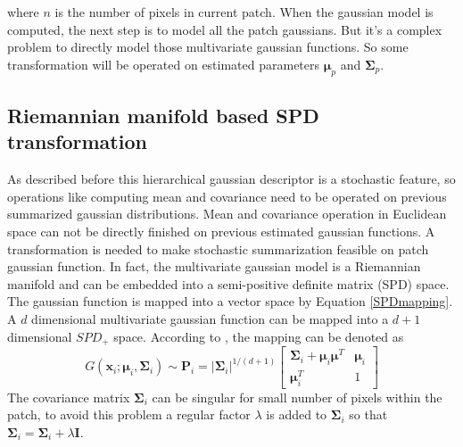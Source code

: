 where $n$ is the number of pixels in current patch. When the gaussian model is computed, the next step is to model all the patch gaussians. But it's a complex problem to directly model those multivariate gaussian functions. So some transformation will be operated on estimated parameters $\bm{\mu}_p$ and $\bm{\Sigma}_p$.


\subsection{Riemannian manifold based SPD transformation}

As described before this hierarchical gaussian descriptor is a stochastic feature, so operations like computing mean and covariance need to be operated on previous summarized gaussian distributions. Mean and covariance operation in Euclidean space can not be directly finished on previous estimated gaussian functions. A transformation is needed to make stochastic summarization feasible on patch gaussian function.
In fact, the multivariate gaussian model is a Riemannian manifold and can be embedded into a semi-positive definite matrix (SPD) space. The gaussian function is mapped into a vector space by Equation \ref{SPDmapping}. A $d$ dimensional multivariate gaussian function can be mapped into a $d+1$ dimensional $SPD_+$ space. According to \cite{MultiVarGau}, the mapping can be denoted as 
\begin{equation}\label{SPDmapping}
G(\bm{x}_i;\bm{\mu}_i,\bm{\Sigma}_i) \sim \bm{P}_i  = |\bm{\Sigma}_i|^{1/(d+1)} \left[ \begin{matrix}
\bm{\Sigma}_i + \bm{\mu}_i\bm{\mu}^T & \bm{\mu}_i \\
\bm{\mu}_i^T & 1
\end{matrix}
\right]
\end{equation}
The covariance matrix $\bm{\Sigma}_i$ can be singular for small number of pixels within the patch, to avoid this problem a regular factor $\lambda$ is added to $\bm{\Sigma}_i$ so that $\bm{\Sigma}_i = \bm{\Sigma}_i + \lambda\bm{I}$. 

